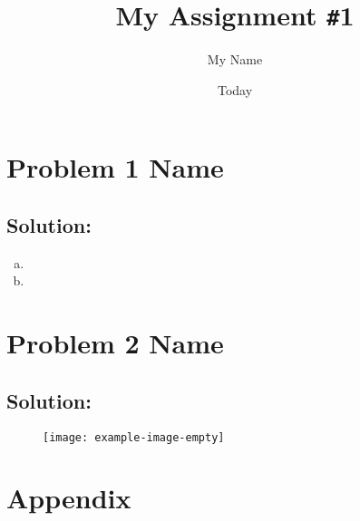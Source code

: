 \documentclass[
	12pt, %
]{fphw_assignment}
\title{My Assignment \texttt{\#}1}        %
\author{My Name}    %
\date{Today}        %
\institute{Department of Physics}              %
\begin{document}
\maketitle


\section{Problem 1 Name~\cite{book:zettili}}
\begin{problem}
  \lipsum[1][5-6]
\end{problem}

\subsection*{Solution:}
\blindtext
\begin{enumerate}[(a)]
\item 
\lipsum[2][5]
\item 
\lipsum[2][5]
\end{enumerate} 

\newpage
\section{Problem 2 Name~\cite{book:zettili}}
\begin{problem}
\lipsum[4][5-6]
\end{problem}

\subsection{Solution:}
\blindtext
\begin{figure}[!ht]
  \centering
  \texttt{[image: example-image-empty]}
  \caption{ \lipsum[5][2]\cite{book:griffiths}}
  \label{fig:fig1}
\end{figure}

\section{Appendix}
\begin{problem}
  \centering  \lipsum[6][3]
\end{problem}
{\footnotesize
\blindtext \cite{book:balakrishnan}
}

\newpage
\printbibliography
\end{document}
